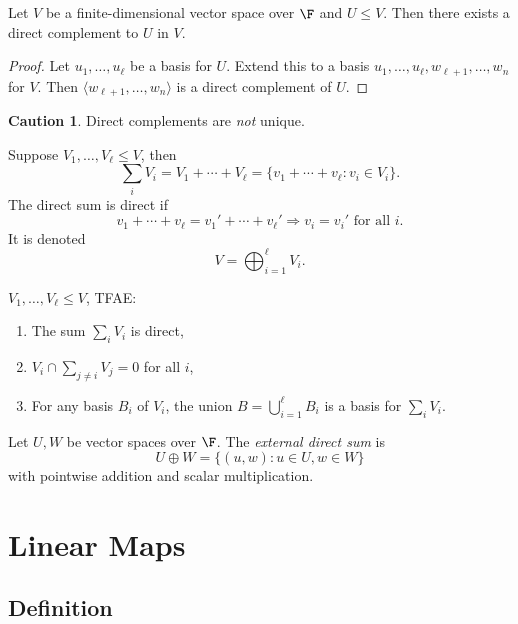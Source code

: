 \documentclass[a4paper]{article}
\theoremstyle{definition}
\newtheorem*{caution}{Caution}
\begin{document}
\begin{lem}
  Let \(V\) be a finite-dimensional vector space over \(\F\) and \(U\leq V\). Then there exists a direct complement to \(U\) in \(V\).
\end{lem}

\begin{proof}
  Let \(u_1,\ldots, u_\ell\) be a basis for \(U\). Extend this to a basis \(u_1,\ldots, u_\ell,w_{\ell+1},\ldots,w_n\) for \(V\). Then \(\langle w_{\ell+1},\ldots,w_n\rangle\) is a direct complement of \(U\).
\end{proof}

\begin{caution}
  Direct complements are \emph{not} unique.
\end{caution}

\begin{defi}
  Suppose \(V_1,\ldots, V_\ell \leq V\), then
  \[
\sum_i V_i = V_1+\cdots+V_\ell = \{v_1+\cdots+v_\ell: v_i\in V_i\}.
  \]
  The direct sum is direct if
  \[
    v_1+\cdots+v_\ell = v_1'+\cdots+ v_\ell' \Rightarrow v_i = v_i' \text{ for all } i.
  \]
  It is denoted
  \[
V = \bigoplus_{i=1}^\ell V_i.
  \]
\end{defi}

\begin{ex}
  \(V_1,\ldots, V_\ell \leq V\), TFAE:
  \begin{enumerate}
  \item The sum \(\sum_i V_i\) is direct,
  \item \(V_i \cap \sum_{j\neq i}V_j = 0\) for all \(i\),
  \item For any basis \(B_i\) of \(V_i\), the union \(B=\bigcup_{i=1}^\ell B_i\) is a basis for \(\sum_i V_i\).
  \end{enumerate}
\end{ex}

\begin{defi}
  Let \(U, W\) be vector spaces over \(\F\). The \emph{external direct sum} is
  \[
U\oplus W = \{(u,w): u\in U, w\in W\}
  \]
  with pointwise addition and scalar multiplication.
\end{defi}

\section{Linear Maps}

\subsection{Definition}
\end{document}
